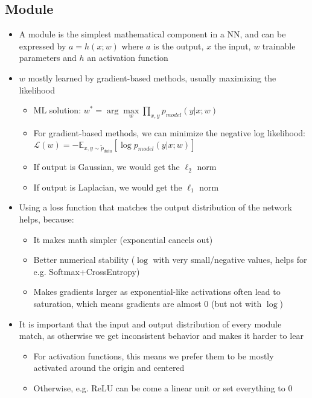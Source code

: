 \subsection{Module}
\begin{itemize}
	\item A module is the simplest mathematical component in a NN, and can be expressed by $a=h(x;w)$ where $a$ is the output, $x$ the input, $w$ trainable parameters and $h$ an activation function
	\item $w$ mostly learned by gradient-based methods, usually maximizing the likelihood
	\begin{itemize}
		\item ML solution: $w^{*} = \arg\max\limits_{w}\prod\limits_{x,y}p_{model}\left(y|x;w\right)$
		\item For gradient-based methods, we can minimize the negative log likelihood:\\ $\mathcal{L}(w) = -\mathbb{E}_{x,y\sim \tilde{p}_{data}}\left[\log p_{model}\left(y|x;w\right)\right]$
		\item If output is Gaussian, we would get the $\ell_2$ norm
		\item If output is Laplacian, we would get the $\ell_1$ norm
	\end{itemize} 
	\item Using a loss function that matches the output distribution of the network helps, because:
	\begin{itemize}
		\item It makes math simpler (exponential cancels out)
		\item Better numerical stability ($\log$ with very small/negative values, helps for e.g. Softmax+CrossEntropy)
		\item Makes gradients larger as exponential-like activations often lead to saturation, which means gradients are almost 0 (but not with $\log$)
	\end{itemize}
	\item It is important that the input and output distribution of every module match, as otherwise we get inconsistent behavior and makes it harder to lear
	\begin{itemize}
		\item For activation functions, this means we prefer them to be mostly activated around the origin and centered
		\item Otherwise, e.g. ReLU can be come a linear unit or set everything to 0
	\end{itemize}
\end{itemize}
